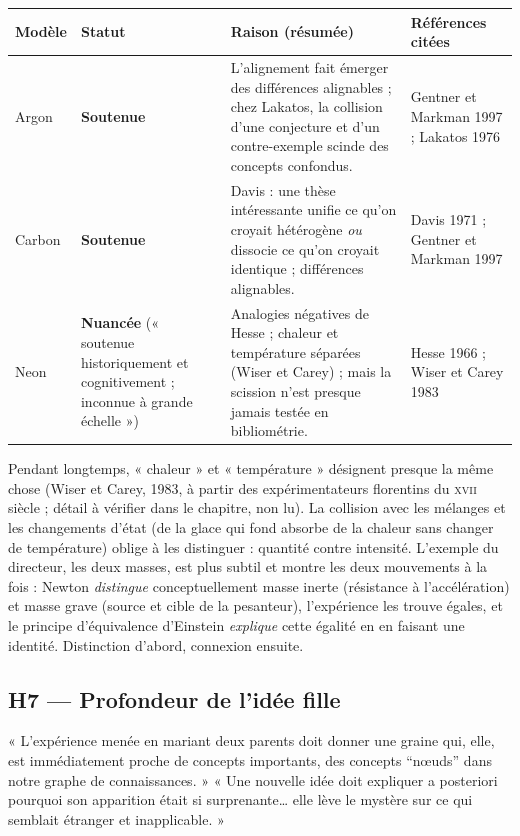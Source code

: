 \documentclass[a4paper,11pt]{article}
\makeatletter
\newenvironment{avis}{\small\renewcommand{\arraystretch}{1.15}%
\begin{longtable}{@{}>{\raggedright\arraybackslash}p{1.35cm}>{\raggedright\arraybackslash}p{2.45cm}>{\raggedright\arraybackslash}p{7.15cm}>{\raggedright\arraybackslash}p{4.4cm}@{}}
\toprule \textbf{Modèle} & \textbf{Statut} & \textbf{Raison (résumée)} & \textbf{Références citées}\\ \midrule \endhead
\bottomrule \endfoot}{\end{longtable}}
\newcommand{\st}[1]{\textbf{#1}}
\makeatother
\begin{document}
\begin{avis}
Argon & \st{Soutenue} & L'alignement fait émerger des différences alignables ; chez Lakatos, la collision d'une conjecture et d'un contre-exemple scinde des concepts confondus. & Gentner et Markman 1997 ; Lakatos 1976\\ \midrule
Carbon & \st{Soutenue} & Davis : une thèse intéressante unifie ce qu'on croyait hétérogène \emph{ou} dissocie ce qu'on croyait identique ; différences alignables. & Davis 1971 ; Gentner et Markman 1997\\ \midrule
Neon & \st{Nuancée} (« soutenue historiquement et cognitivement ; inconnue à grande échelle ») & Analogies négatives de Hesse ; chaleur et température séparées (Wiser et Carey) ; mais la scission n'est presque jamais testée en bibliométrie. & Hesse 1966 ; Wiser et Carey 1983\\
\end{avis}

\begin{exemple}
Pendant longtemps, « chaleur » et « température » désignent presque la même chose (Wiser et Carey, 1983, à partir des expérimentateurs florentins du \textsc{xvii}\ieme{} siècle ; détail à vérifier dans le chapitre, non lu). La collision avec les mélanges et les changements d'état (de la glace qui fond absorbe de la chaleur sans changer de température) oblige à les distinguer : quantité contre intensité. L'exemple du directeur, les deux masses, est plus subtil et montre les deux mouvements à la fois : Newton \emph{distingue} conceptuellement masse inerte (résistance à l'accélération) et masse grave (source et cible de la pesanteur), l'expérience les trouve égales, et le principe d'équivalence d'Einstein \emph{explique} cette égalité en en faisant une identité. Distinction d'abord, connexion ensuite.
\end{exemple}

\subsection{H7 — Profondeur de l'idée fille}
\begin{enonce}
« L'expérience menée en mariant deux parents doit donner une graine qui, elle, est immédiatement proche de concepts importants, des concepts “nœuds” dans notre graphe de connaissances. » « Une nouvelle idée doit expliquer a posteriori pourquoi son apparition était si surprenante… elle lève le mystère sur ce qui semblait étranger et inapplicable. »
\end{enonce}
\end{document}
